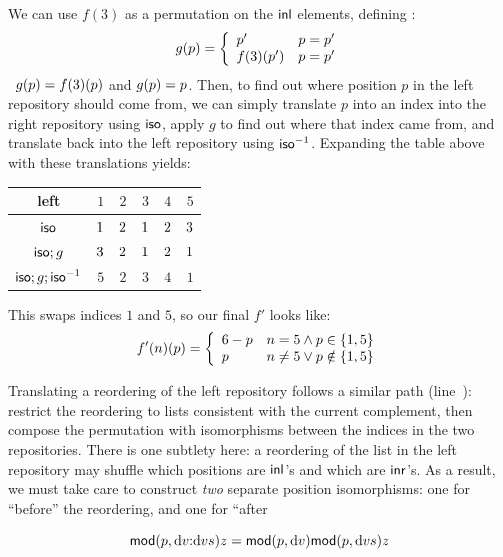 We can use $f(3)$ as a permutation on the $\mathsf{inl}$ elements, defining%
\ifdissertation:
\[g(p) = \left\{\begin{array}{ll}{p'} & p = {p'} \\
               {f(3)(p')} & p = {p'}\end{array}\right.\]
\else\ $g( p)={f(3)(p)}$ and $g( p)= p$. \fi Then, to find out
where position $p$ in the left repository should come from, we can simply
translate $p$ into an index into the right repository using $\mathsf{iso}$, apply
$g$ to find out where that index came from, and translate back into the left
repository using $\mathsf{iso}^{-1}$. Expanding the table above with these
translations yields:
\begin{center}
\begin{tabular}{@{}c|ccccc@{}}
    left & $1$ & $2$ & $3$ & $4$ & $5$ \\
    \hline
    $\mathsf{iso}$ & $ 1$ & $ 2$ & $ 1$ & $ 2$ & $ 3$ \\
    $\mathsf{iso};g$ & $ 3$ & $ 2$ & $ 1$ & $ 2$ & $ 1$ \\
    $\mathsf{iso};g;\mathsf{iso}^{-1}$ & $5$ & $2$ & $3$ & $4$ & $1$
\end{tabular}
\end{center}
This swaps indices $1$ and $5$, so our final $f'$ looks like:
\[f'(n)(p) = \left\{\begin{array}{ll}
    6-p & n = 5 \land p \in \{1,5\} \\
    p & n \ne 5 \lor p \notin \{1,5\}
    \end{array}\right.\]

Translating a reordering of the left repository follows a similar path (line~):
restrict the reordering to lists consistent with the current complement,
then compose the permutation with isomorphisms between the indices in the
two repositories. There is one subtlety here: a reordering of the list
in the left repository may shuffle which positions are $\mathsf{inl}$'s and which
are $\mathsf{inr}$'s. As a result, we must take care to construct \emph{two}
separate position isomorphisms: one for ``before'' the reordering, and one
for ``after\dotquote


\iffull
\begin{lemma}
    \label{lemma:unfold-mod-once}
    \[\mathsf{mod}(p,\textrm{d} v\mathord{:}\textrm{d} v s)z=\mathsf{mod}(p,\textrm{d} v)\mathsf{mod}(p,\textrm{d} v s)z\]
\end{lemma}

